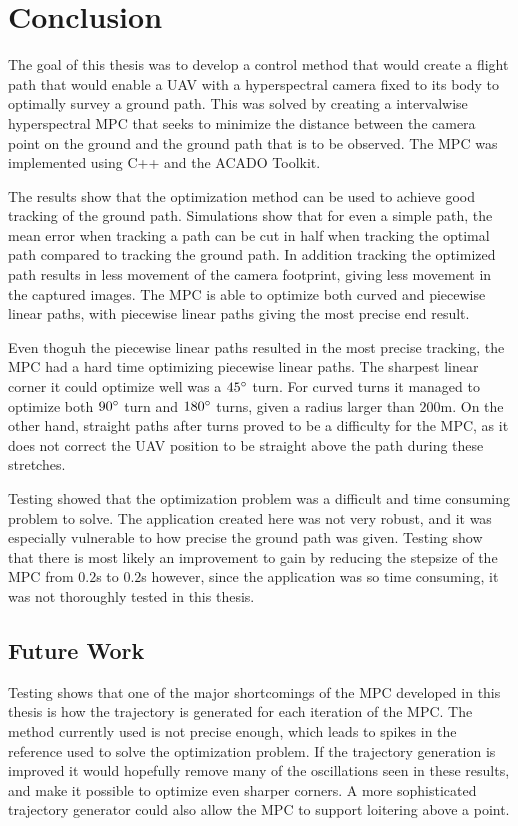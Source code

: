 \chapter{Conclusion}

The goal of this thesis was to develop a control method that would create a flight path that would enable a UAV with a hyperspectral camera fixed to its body to optimally survey a ground path. This was solved by creating a intervalwise hyperspectral MPC that seeks to minimize the distance between the camera point on the ground and the ground path that is to be observed. The MPC was implemented using C++ and the ACADO Toolkit.

The results show that the optimization method can be used to achieve good tracking of the ground path. Simulations show that for even a simple path, the mean error when tracking a path can be cut in half when tracking the optimal path compared to tracking the ground path. In addition tracking the optimized path results in less movement of the camera footprint, giving less movement in the captured images. The MPC is able to optimize both curved and piecewise linear paths, with piecewise linear paths giving the most precise end result.

Even thoguh the piecewise linear paths resulted in the most precise tracking, the MPC had a hard time optimizing piecewise linear paths. The sharpest linear corner it could optimize well was a $45\degree$ turn. For curved turns it managed to optimize both $90\degree$ turn and $180\degree$ turns, given a radius larger than $200$m. On the other hand, straight paths after turns proved to be a difficulty for the MPC, as it does not correct the UAV position to be straight above the path during these stretches.

Testing showed that the optimization problem was a difficult and time consuming problem to solve. The application created here was not very robust, and it was especially vulnerable to how precise the ground path was given. Testing show that there is most likely an improvement to gain by reducing the stepsize of the MPC from $0.2$s to $0.2$s however, since the application was so time consuming, it was not thoroughly tested in this thesis.


\section{Future Work}

Testing shows that one of the major shortcomings of the MPC developed in this thesis is how the trajectory is generated for each iteration of the MPC. The method currently used is not precise enough, which leads to spikes in the reference used to solve the optimization problem. If the trajectory generation is improved it would hopefully remove many of the oscillations seen in these results, and make it possible to optimize even sharper corners. A more sophisticated trajectory generator could also allow the MPC to support loitering above a point.

